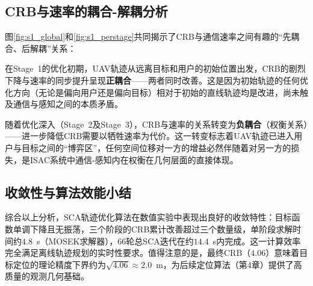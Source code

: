 \subsection{CRB与速率的耦合-解耦分析}

图\ref{fig:s1_global}和\ref{fig:s1_perstage}共同揭示了CRB与通信速率之间有趣的“先耦合、后解耦”关系：

在Stage~1的优化初期，UAV轨迹从远离目标和用户的初始位置出发，CRB的剧烈下降与速率的同步提升呈现\textbf{正耦合}——两者同时改善。这是因为初始轨迹的任何优化方向（无论是偏向用户还是偏向目标）相对于初始的直线轨迹均是改进，尚未触及通信与感知之间的本质矛盾。

随着优化深入（Stage~2及Stage~3），CRB与速率的关系转变为\textbf{负耦合}（权衡关系）——进一步降低CRB需要以牺牲速率为代价。这一转变标志着UAV轨迹已进入用户与目标之间的“博弈区”，任何空间位移对一方的增益必然伴随着对另一方的损失，是ISAC系统中通信-感知内在权衡在几何层面的直接体现。

\subsection{收敛性与算法效能小结}

综合以上分析，SCA轨迹优化算法在数值实验中表现出良好的收敛特性：目标函数单调下降且无振荡，三个阶段的CRB累计改善超过三个数量级，单阶段求解时间约$4.8$~s（MOSEK求解器），66轮总SCA迭代在约$14.4$~s内完成。这一计算效率完全满足离线轨迹规划的实时性要求。值得注意的是，最终CRB（$4.06$）意味着目标定位的理论精度下界约为$\sqrt{4.06}\approx2.0$~m，为后续定位算法（第4章）提供了高质量的观测几何基础。
